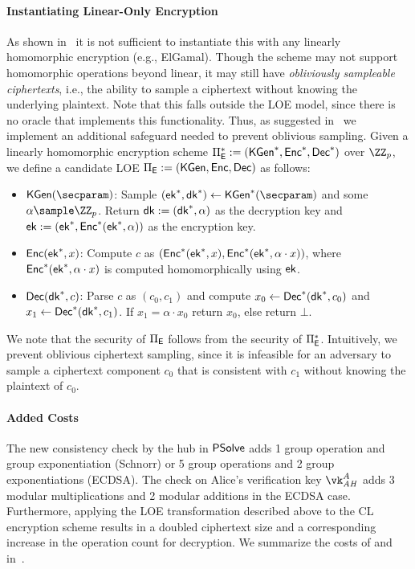 \paragraph{Instantiating Linear-Only Encryption} 
As shown in~\cite{TCC:BCIOP13} it is not sufficient to instantiate this with any linearly homomorphic encryption (e.g., ElGamal). Though the scheme may not support homomorphic operations beyond linear, it may still have \emph{obliviously sampleable ciphertexts}, i.e., the ability to sample a ciphertext without knowing the underlying plaintext. Note that this falls outside the LOE model, since there is no oracle that implements this functionality. Thus, as suggested in~\cite{TCC:BCIOP13} we implement an additional safeguard needed to prevent oblivious sampling. Given a linearly homomorphic encryption scheme $\Pi_{\mathsf{E}}^* := ({\mathsf{KGen}}^*,{\mathsf{Enc}}^*,{\mathsf{Dec}}^*)$ over $\ZZ_p$, we define a candidate LOE $\Pi_{\mathsf{E}} := ({\mathsf{KGen}},{\mathsf{Enc}},{\mathsf{Dec}})$ as follows:

\begin{itemize}
    \item $\kgen(\secparam)$: Sample $(\ek^*, \dk^*) \gets \kgen^*(\secparam)$ and some $\alpha \sample\ZZ_p$. Return $\mathsf{dk}:=(\mathsf{dk}^*, \alpha)$ as the decryption key and $\mathsf{ek}:=(\mathsf{ek}^*, {\mathsf{Enc}}^*(\mathsf{ek}^*, \alpha))$ as the encryption key.
    \item ${\mathsf{Enc}}(\mathsf{ek}^*,x)$: Compute $c$ as $({\mathsf{Enc}}^*(\mathsf{ek}^*, x), {\mathsf{Enc}}^*(\mathsf{ek}^*, \alpha \cdot x))$, where ${\mathsf{Enc}}^*(\mathsf{ek}^*,\allowbreak \alpha \cdot x)$ is computed homomorphically using $\mathsf{ek}$.
    \item ${\mathsf{Dec}}(\mathsf{dk}^*,c)$: Parse $c$ as $(c_0, c_1)$ and compute $x_0 \gets {\mathsf{Dec}}^*(\mathsf{dk}^*, c_0)$ and $x_1 \gets {\mathsf{Dec}}^*(\mathsf{dk}^*, c_1)$. If $x_1 = \alpha \cdot x_0$ return $x_0$, else return $\bot$.
\end{itemize}

We note that the security of $\Pi_{\mathsf{E}}$ follows from the security of $\Pi_{\mathsf{E}}^*$. 
Intuitively, we prevent oblivious ciphertext sampling, since it is infeasible for an adversary to sample a ciphertext component $c_0$ that is consistent with $c_1$ without knowing the  plaintext of $c_0$.

\paragraph{Added Costs} 
The new consistency check by the hub in $\mathsf{PSolve}$ adds 1 group operation and group exponentiation (Schnorr) or 5 group operations and 2 group exponentiations (ECDSA). The check on Alice's verification key $\vk_\ah^A$ adds 3 modular multiplications and 2 modular additions in the ECDSA case. Furthermore, applying the LOE transformation described above to the CL encryption scheme results in a doubled ciphertext size and a corresponding increase in the operation count for decryption. %
We summarize the costs of \aal and \aalplus in~.

